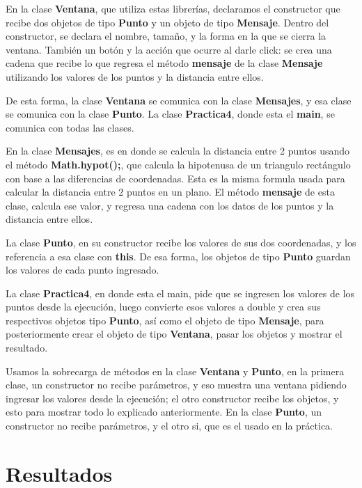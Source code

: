 \documentclass[letterpaper,12pt]{article}
\begin{document}
En la clase \textbf{Ventana}, que utiliza estas librerías, declaramos el constructor que recibe dos objetos de tipo \textbf{Punto} y un objeto de tipo \textbf{Mensaje}. Dentro del constructor, se declara el nombre, tamaño, y la forma en la que se cierra la ventana. También un botón y la acción que ocurre al darle click: se crea una cadena que recibe lo que regresa el método \textbf{mensaje} de la clase \textbf{Mensaje} utilizando los valores de los puntos y la distancia entre ellos. 

De esta forma, la clase \textbf{Ventana} se comunica con la clase \textbf{Mensajes}, y esa clase se comunica con la clase \textbf{Punto}. La clase \textbf{Practica4}, donde esta el \textbf{main}, se comunica con todas las clases.

En la clase \textbf{Mensajes}, es en donde se calcula la distancia entre 2 puntos usando el método \textbf{Math.hypot();}, que calcula la hipotenusa de un triangulo rectángulo con base a las diferencias de coordenadas. Esta es la misma formula usada para calcular la distancia entre 2 puntos en un plano. El método \textbf{mensaje} de esta clase, calcula ese valor, y regresa una cadena con los datos de los puntos y la distancia entre ellos.

La clase \textbf{Punto}, en su constructor recibe los valores de sus dos coordenadas, y los referencia a esa clase con \textbf{this}. De esa forma,  los objetos de tipo \textbf{Punto} guardan los valores de cada punto ingresado.

La clase \textbf{Practica4}, en donde esta el main, pide que se ingresen los valores de los puntos desde la ejecución, luego convierte esos valores a double y crea sus respectivos objetos tipo \textbf{Punto}, así como el objeto de tipo \textbf{Mensaje}, para posteriormente crear el objeto de tipo \textbf{Ventana}, pasar los objetos y mostrar el resultado.

Usamos la sobrecarga de métodos en la clase \textbf{Ventana} y \textbf{Punto}, en la primera clase, un constructor no recibe parámetros, y eso muestra una ventana pidiendo ingresar los valores desde la ejecución; el otro constructor recibe los objetos, y esto para mostrar todo lo explicado anteriormente. En la clase \textbf{Punto}, un constructor no recibe parámetros, y el otro si, que es el usado en la práctica.

\section{Resultados}
\end{document}

